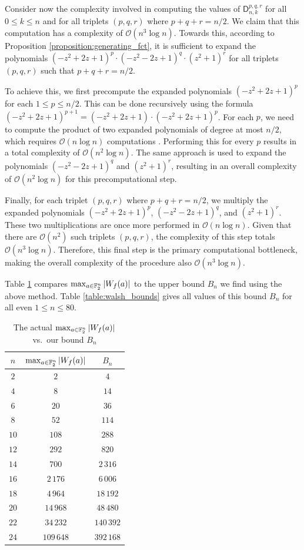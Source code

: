 \documentclass[11pt]{llncs}
\begin{document}
Consider now the complexity involved in computing the values of $\mathsf{D}_{n,k}^{p,q,r}$ for all $0 \leq k \leq n$ and for all triplets $(p,q,r)$ where $p+q+r=n/2$. We claim that this computation has a complexity of $\mathcal{O}(n^3 \log n)$. Towards this, according to Proposition \ref{proposition:generating_fct}, it is sufficient to expand the polynomials $(-z^2 + 2z + 1)^p \cdot (-z^2 - 2z + 1)^q \cdot (z^2 + 1)^r$ for all triplets $(p,q,r)$ such that $p+q+r=n/2$.

To achieve this, we first precompute the expanded polynomials $(-z^2 + 2z + 1)^p$ for each $1 \leq p \leq n/2$. This can be done recursively using the formula $(-z^2 + 2z + 1)^{p+1} = (-z^2 + 2z + 1) \cdot (-z^2 + 2z + 1)^p$. For each $p$, we need to compute the product of two expanded polynomials of degree at most $n/2$, which requires $\mathcal{O}(n \log n)$ computations . Performing this for every $p$ results in a total complexity of $\mathcal{O}(n^2 \log n)$. The same approach is used to expand the polynomials $(-z^2 - 2z + 1)^q$ and $(z^2 + 1)^r$, resulting in an overall complexity of $\mathcal{O}(n^2 \log n)$ for this precomputational step.

Finally, for each triplet $(p,q,r)$ where $p+q+r=n/2$, we multiply the expanded polynomials $(-z^2 + 2z + 1)^p$, $(-z^2 - 2z + 1)^q$, and $(z^2 + 1)^r$. These two multiplications are once more performed in $\mathcal{O}(n \log n)$. Given that there are $\mathcal{O}(n^2)$ such triplets $(p,q,r)$, the complexity of this step totals $\mathcal{O}(n^3 \log n)$. Therefore, this final step is the primary computational bottleneck, making the overall complexity of the procedure also $\mathcal{O}(n^3 \log n)$.

Table \ref{table:max_walsh_vs_bound} compares $\max_{a\in\mathbb F_2^n}|W_{f}(a)|$ to the upper bound $B_n$ we find using the above method. Table \ref{table:walsh_bounds} gives all values of this bound $B_n$ for all even $1\leq n\leq 80$.

\begin{table}
	\centering
	\begin{tabular}{|c|c|c|}
		\hline
		$n$ & $\max_{a\in\mathbb{F}_2^n}|W_f(a)|$ & $B_n$ \\ \hline
		$2$  & $2$     & $4$     \\
		$4$  & $8$     & $14$     \\
		$6$  & $20$    & $36$    \\
		$8$  & $52$    & $114$    \\
		$10$ & $108$   & $288$   \\
		$12$ & $292$   & $820$   \\
		$14$ & $700$   & $2\,316$  \\
		$16$ & $2\,176$  & $6\,006$  \\
		$18$ & $4\,964$  & $18\,192$  \\
		$20$ & $14\,968$ & $48\,480$ \\
		$22$ & $34\,232$ & $140\,392$ \\
		$24$ & $109\,648$ & $392\,168$ \\ \hline
	\end{tabular}
	\caption{The actual $\max_{a\in\mathbb{F}_2^n}|W_f(a)|$ vs.\ our bound $B_n$}
	\label{table:max_walsh_vs_bound}
\end{table}
\end{document}
